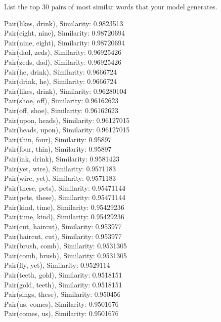 \problem[1]
List the top 30 pairs of most similar words that your model generates.
\begin{solution}
	
	Pair(likes, drink), Similarity: 0.9823513 \\
	Pair(eight, nine), Similarity: 0.98720694 \\
	Pair(nine, eight), Similarity: 0.98720694 \\
	Pair(dad, zeds), Similarity: 0.96925426 \\
	Pair(zeds, dad), Similarity: 0.96925426 \\
	Pair(he, drink), Similarity: 0.9666724 \\
	Pair(drink, he), Similarity: 0.9666724 \\
	Pair(likes, drink), Similarity: 0.96280104 \\
	Pair(shoe, off), Similarity: 0.96162623 \\
	Pair(off, shoe), Similarity: 0.96162623 \\
	Pair(upon, heads), Similarity: 0.96127015 \\
	Pair(heads, upon), Similarity: 0.96127015 \\
	Pair(thin, four), Similarity: 0.95897 \\
	Pair(four, thin), Similarity: 0.95897 \\
	Pair(ink, drink), Similarity: 0.9581423 \\
	Pair(yet, wire), Similarity: 0.9571183 \\
	Pair(wire, yet), Similarity: 0.9571183 \\
	Pair(these, pets), Similarity: 0.95471144 \\
	Pair(pets, these), Similarity: 0.95471144 \\
	Pair(kind, time), Similarity: 0.95429236 \\
	Pair(time, kind), Similarity: 0.95429236 \\
	Pair(cut, haircut), Similarity: 0.953977 \\
	Pair(haircut, cut), Similarity: 0.953977 \\
	Pair(brush, comb), Similarity: 0.9531305 \\
	Pair(comb, brush), Similarity: 0.9531305 \\
	Pair(fly, yet), Similarity: 0.9529114 \\
	Pair(teeth, gold), Similarity: 0.9518151 \\
	Pair(gold, teeth), Similarity: 0.9518151 \\
	Pair(sings, these), Similarity: 0.950456 \\
	Pair(us, comes), Similarity: 0.9501676 \\
	Pair(comes, us), Similarity: 0.9501676 \\
\end{solution}

